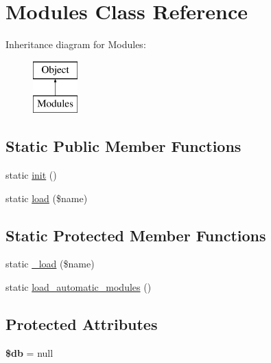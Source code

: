 \hypertarget{class_modules}{
\section{Modules Class Reference}
\label{class_modules}
}
Inheritance diagram for Modules:\begin{figure}[H]
\begin{center}
\leavevmode
\includegraphics[height=2.000000cm]{class_modules}
\end{center}
\end{figure}
\subsection*{Static Public Member Functions}
\begin{DoxyCompactItemize}
\item 
static \hyperlink{class_modules_a9f0be6ae273d3669e11c29910a0be338}{init} ()
\item 
static \hyperlink{class_modules_a26e162b6a3d4942a4e9859d7fa7e1168}{load} (\$name)
\end{DoxyCompactItemize}
\subsection*{Static Protected Member Functions}
\begin{DoxyCompactItemize}
\item 
static \hyperlink{class_modules_a5d45011cda3d16c13bbc81242e540dca}{\_\-load} (\$name)
\item 
static \hyperlink{class_modules_a71da93628d8cc592ca0f9ca7b615477d}{load\_\-automatic\_\-modules} ()
\end{DoxyCompactItemize}
\subsection*{Protected Attributes}
\begin{DoxyCompactItemize}
\item 
\hypertarget{class_object_a1fa3127fc82f96b1436d871ef02be319}{
{\bfseries \$db} = null}
\label{class_object_a1fa3127fc82f96b1436d871ef02be319}

\end{DoxyCompactItemize}



